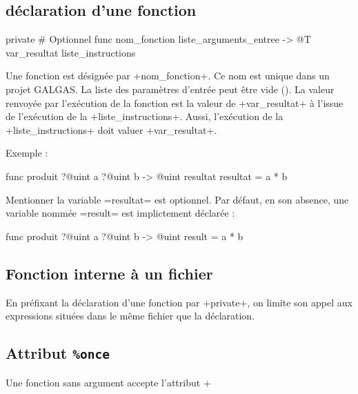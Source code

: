 \subsection{déclaration d'une fonction}

\begin{galgas}
private # Optionnel
func nom_fonction liste_arguments_entree -> @T var_resultat {
  liste_instructions
}
\end{galgas}

Une fonction est désignée par \ggs+nom_fonction+. Ce nom est unique dans un projet GALGAS. La liste des paramètres d'entrée peut être vide (). La valeur renvoyée par l'exécution de la fonction est la valeur de \ggs+var_resultat+ à l'issue de l'exécution de la \ggs+liste_instructions+. Aussi, l'exécution de la \ggs+liste_instructions+ doit valuer \ggs+var_resultat+.

Exemple :

\begin{galgas}
func produit ?@uint a ?@uint b -> @uint resultat {
  resultat = a * b
}
\end{galgas}

Mentionner la variable \ggs=resultat= est optionnel. Par défaut, en son absence, une variable nommée \ggs=result= est implictement déclarée :

\begin{galgas}
func produit ?@uint a ?@uint b -> @uint {
  result = a * b
}
\end{galgas}




\subsection{Fonction interne à un fichier}

En préfixant la déclaration d'une fonction par \ggs+private+, on limite son appel aux expressions situées dans le même fichier que la déclaration.




\subsection{Attribut \texttt{\%once}}

Une fonction sans argument accepte l'attribut \ggs+%


